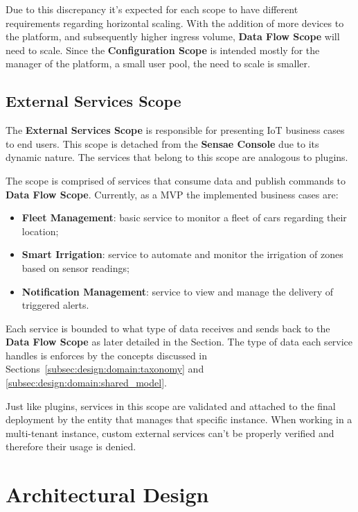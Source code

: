 Due to this discrepancy it's expected for each scope to have different requirements regarding horizontal scaling. With the addition of more devices to the platform, and subsequently higher ingress volume, \textbf{Data Flow Scope} will need to scale. Since the \textbf{Configuration Scope} is intended mostly for the manager of the platform, a small user pool, the need to scale is smaller.

\subsection{External Services Scope}
\label{subsec:design:system_scopes:service_scope}

The \textbf{External Services Scope} is responsible for presenting \gls{IoT} business cases to end users. This scope is detached from the \textbf{Sensae Console} due to its dynamic nature. The services that belong to this scope are analogous to plugins.

The scope is comprised of services that consume data and publish commands to \textbf{Data Flow Scope}. Currently, as a \gls{MVP} the implemented business cases are:

\begin{itemize}
   \item \textbf{Fleet Management}: basic service to monitor a fleet of cars regarding their location;
   \item \textbf{Smart Irrigation}: service to automate and monitor the irrigation of zones based on sensor readings;
   \item \textbf{Notification Management}: service to view and manage the delivery of triggered alerts.
\end{itemize}

Each service is bounded to what type of data receives and sends back to the \textbf{Data Flow Scope} as later detailed in the  Section. The type of data each service handles is enforces by the concepts discussed in Sections~\ref{subsec:design:domain:taxonomy} and \ref{subsec:design:domain:shared_model}.

Just like plugins, services in this scope are validated and attached to the final deployment by the entity that manages that specific instance. When working in a multi-tenant instance, custom external services can't be properly verified and therefore their usage is denied.

\section{Architectural Design}
\label{sec:design:architecture}

